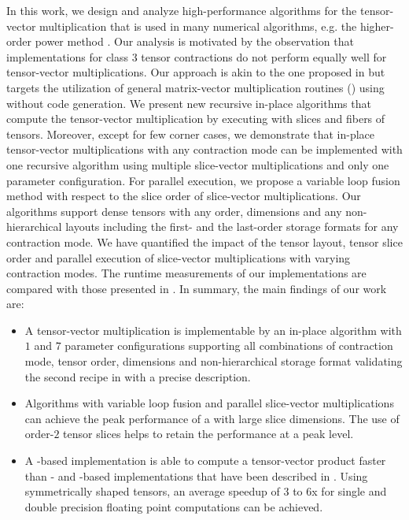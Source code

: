 In this work, we design and analyze high-performance algorithms for the tensor-vector multiplication that is used in many numerical algorithms, e.g. the higher-order power method \cite{lee:2018:fundamental, kolda:2009:decompositions, bader:2006:algorithm862}.
Our analysis is motivated by the observation that implementations for class 3 tensor contractions do not perform equally well for tensor-vector multiplications.
Our approach is akin to the one proposed in \cite{li:2015:input, shi:2016:tensor.contraction} but targets the utilization of general matrix-vector multiplication routines () using  \cite{wang:2013:augem} without code generation.
We present new recursive in-place algorithms that compute the tensor-vector multiplication by executing  with slices and fibers of tensors.
Moreover, except for few corner cases, we demonstrate that in-place tensor-vector multiplications with any contraction mode can be implemented with one recursive algorithm using multiple slice-vector multiplications and only one  parameter configuration.
For parallel execution, we propose a variable loop fusion method with respect to the slice order of slice-vector multiplications. 
Our algorithms support dense tensors with any order, dimensions and any non-hierarchical layouts including the first- and the last-order storage formats for any contraction mode.
We have quantified the impact of the tensor layout, tensor slice order and parallel execution of slice-vector multiplications with varying contraction modes.
The runtime measurements of our implementations are compared with those presented in \cite{springer:2018:design, abadi:2016:tensorflow,matthews:2018:high}.
In summary, the main findings of our work are:
\begin{itemize}
	\item 
	A tensor-vector multiplication is implementable by an in-place algorithm with $1$  and $7$  parameter configurations supporting all combinations of contraction mode, tensor order, dimensions and non-hierarchical storage format validating the second recipe in \cite{dinapoli:2014:towards.efficient.use} with a precise description.
	\item 
	Algorithms with variable loop fusion and parallel slice-vector multiplications can achieve the peak performance of a  with large slice dimensions. %
	The use of order-$2$ tensor slices helps to retain the performance at a peak level.
	\item
	A -based implementation is able to compute a tensor-vector product faster than - and -based implementations that have been described in \cite{springer:2018:design,matthews:2018:high,abadi:2016:tensorflow}.
	Using symmetrically shaped tensors, an average speedup of $3$ to $6$x for single and double precision floating point computations can be achieved.
\end{itemize}

